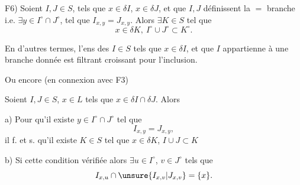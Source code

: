 
F6) Soient $I,J\in S$,  tels que $x\in\delta I$, $x\in\delta J$, et que $I,J$ définissent la $=$ branche i.e. $\exists y\in I^\circ\cap J^\circ$,  tel que $I_{x,y}=J_{x,y}$. Alors $\exists K\in S$ tel que
\[
x\in\delta K,\ I^\circ\cup J^\circ\subset K^\circ.
\]

En d'autres termes, l'ens des  $I\in S$ tels que $x\in\delta I$, et que $I$ appartienne à une branche donnée  est filtrant croissant pour l'inclusion.


Ou encore (en connexion avec F3)

Soient $I,J\in S$, $x\in L$ tels que $x\in\delta I\cap\delta J$. Alors

a) Pour qu'il existe $y\in I^\circ\cap J^\circ$ tel que
\[
I_{x,y}=J_{x,y},
\]
il f. et s. qu'il existe $K\in S$ tel que $x\in\delta K$, $I\cup J\subset K$

b) Si cette condition  vérifiée alors $\exists u\in I^\circ$, $v\in J^\circ$ tels que
\[
I_{x,u}\cap\unsure{I_{x,v}|J_{x,v}}=\{x\}.
\]


